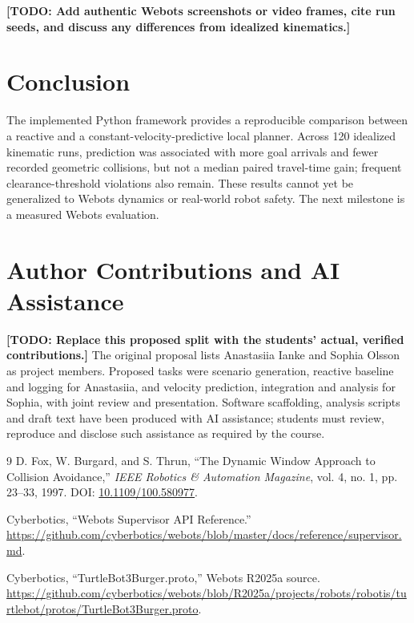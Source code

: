 \documentclass[11pt,a4paper]{article}
\newcommand{\pending}[1]{\textcolor{red!65!black}{\textbf{[TODO: #1]}}}
\begin{document}
\pending{Add authentic Webots screenshots or video frames, cite run seeds, and discuss any differences from idealized kinematics.}

\section{Conclusion}
The implemented Python framework provides a reproducible comparison between a reactive and a constant-velocity-predictive local planner. Across 120 idealized kinematic runs, prediction was associated with more goal arrivals and fewer recorded geometric collisions, but not a median paired travel-time gain; frequent clearance-threshold violations also remain. These results cannot yet be generalized to Webots dynamics or real-world robot safety. The next milestone is a measured Webots evaluation.

\section*{Author Contributions and AI Assistance}
\pending{Replace this proposed split with the students' actual, verified contributions.} The original proposal lists Anastasiia Ianke and Sophia Olsson as project members. Proposed tasks were scenario generation, reactive baseline and logging for Anastasiia, and velocity prediction, integration and analysis for Sophia, with joint review and presentation. Software scaffolding, analysis scripts and draft text have been produced with AI assistance; students must review, reproduce and disclose such assistance as required by the course.

\begin{thebibliography}{9}
D. Fox, W. Burgard, and S. Thrun, ``The Dynamic Window Approach to Collision Avoidance,'' \emph{IEEE Robotics \& Automation Magazine}, vol. 4, no. 1, pp. 23--33, 1997. DOI: \href{https://doi.org/10.1109/100.580977}{10.1109/100.580977}.

Cyberbotics, ``Webots Supervisor API Reference.'' \url{https://github.com/cyberbotics/webots/blob/master/docs/reference/supervisor.md}.

Cyberbotics, ``TurtleBot3Burger.proto,'' Webots R2025a source. \url{https://github.com/cyberbotics/webots/blob/R2025a/projects/robots/robotis/turtlebot/protos/TurtleBot3Burger.proto}.
\end{thebibliography}
\end{document}
